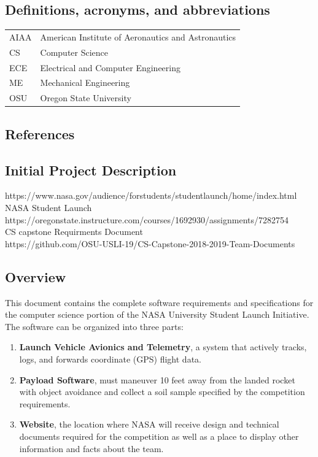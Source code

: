 \documentclass[onecolumn, draftclsnofoot, 10pt, compsoc]{IEEEtran}
\begin{document}
\subsection{Definitions, acronyms, and abbreviations}
\begin{center}
  \begin{tabular}{|l|l|}
      \hline
      AIAA	&American Institute of Aeronautics and Astronautics\\
      CS		&Computer Science\\
      \hline
      ECE		&Electrical and Computer Engineering\\
      ME		&Mechanical Engineering\\
      \hline
      OSU		&Oregon State University\\
      \hline
  \end{tabular}
\end{center}

\subsection{References}
\subsection*{Initial Project Description}
https://www.nasa.gov/audience/forstudents/studentlaunch/home/index.html\\
NASA Student Launch\\
https://oregonstate.instructure.com/courses/1692930/assignments/7282754\\
CS capstone Requirments Document\\
https://github.com/OSU-USLI-19/CS-Capstone-2018-2019-Team-Documents

\subsection{Overview}
This document contains the complete software requirements and specifications for the computer science portion of the NASA University Student Launch Initiative.  The software can be organized into three parts:

\begin{enumerate}
\item \textbf{Launch Vehicle Avionics and Telemetry}, a system that actively tracks, logs, and forwards coordinate (GPS) flight data. 
\item \textbf{Payload Software}, must maneuver 10 feet away from the landed rocket with object avoidance and collect a soil sample specified by the competition requirements.
\item \textbf{Website}, the location where NASA will receive design and technical documents required for the competition as well as a place to display other information and facts about the team.
\end{enumerate}
\end{document}
